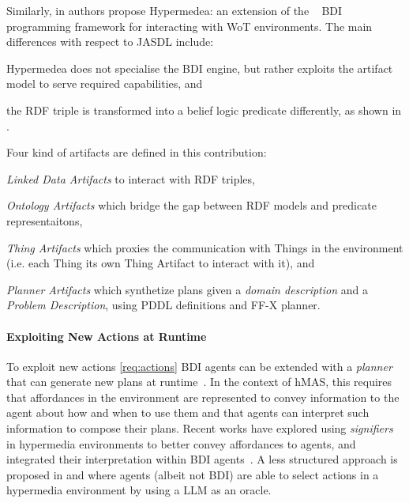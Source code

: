 \documentclass[
]{ceurart}
\begin{document}
Similarly, 
in \cite{DBLP:conf/www/CharpenayZLB22} authors propose Hypermedea: 
an extension of the \jacamo{}~\cite{BOISSIER2013747} \ac{BDI} programming framework
for interacting with \ac{WoT} environments.
%
The main differences with respect to JASDL include:
\begin{inlinelist}
\item Hypermedea does not specialise the \ac{BDI} engine, 
but rather exploits the \cartago{} artifact model to serve required capabilities, and
\item the \ac{RDF} triple is transformed into a belief logic predicate differently, as shown in .
\end{inlinelist} 
%
Four kind of artifacts are defined in this contribution: 
\begin{inlinelist}
  \item \textit{Linked Data Artifacts} to interact with \ac{RDF} triples,
  \item \textit{Ontology Artifacts} which bridge the gap between \ac{RDF} models and predicate representaitons,
  \item \textit{Thing Artifacts} which proxies the communication with Things in the environment (i.e. each Thing its own Thing Artifact to interact with it), and
  \item \textit{Planner Artifacts} which synthetize plans given a \textit{domain description} and a \textit{Problem Description}, using PDDL definitions and FF-X planner. 
\end{inlinelist}




\paragraph{Exploiting New Actions at Runtime}
To exploit new actions \ref{req:actions} \ac{BDI} agents can be extended with a \emph{planner} that can generate new plans at runtime~\cite{MeneguzziS15}. 
In the context of \ac{hMAS}, this requires that affordances in the environment are represented to convey information to the agent about how and when to use them and that agents can interpret such information to compose their plans.
%
Recent works have explored using \emph{signifiers}~\cite{vachtsevanou2023atal} in hypermedia environments to better convey affordances to agents, and integrated their interpretation within \ac{BDI} agents~\cite{vachtsevanou2024atal}.
%
A less structured approach is proposed in \cite{10.1145/3603163.3609077} and \cite{schmid2024kgswc} where agents (albeit not \ac{BDI}) are able to select actions in a hypermedia environment by using a \ac{LLM} as an oracle.
\end{document}
